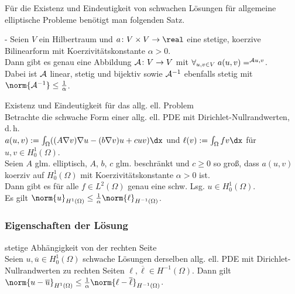 \begin{Bem}
    Für die Existenz und Eindeutigkeit von schwachen Lösungen für allgemeine elliptische Probleme
    benötigt man folgenden Satz.
\end{Bem}

\begin{Satz}{-}
    Seien $V$ ein Hilbertraum und
    $a \colon V \times V \to \real$ eine stetige, koerzive Bilinearform mit
    Koerzivitätskonstante $\alpha > 0$.\\
    Dann gibt es genau eine Abbildung $\mathcal{A}\colon V \to V$ mit
    $\forall_{u, v \in V}\; a(u, v) = \sp{\mathcal{A}u, v}$.\\
    Dabei ist $\mathcal{A}$ linear, stetig und bijektiv sowie $\mathcal{A}^{-1}$ ebenfalls stetig mit
    $\norm{\A^{-1}} \le \frac{1}{\alpha}$.
\end{Satz}

\linie

\begin{Satz}{Existenz und Eindeutigkeit für das allg. ell. Problem}\\
    Betrachte die schwache Form einer allg. ell. PDE mit Dirichlet-Nullrandwerten, d.\,h.\\
    $a(u, v) := \int_\Omega ((A\nabla v) \nabla u - (b \nabla v) u + cuv) \dx$
    und $\ell(v) := \int_\Omega fv \dx$ für $u, v \in H^1_0(\Omega)$.\\
    Seien $A$ glm. elliptisch, $A$, $b$, $c$ glm. beschränkt und
    $c \ge 0$ so groß, dass $a(u, v)$ koerziv auf $H^1_0(\Omega)$ mit Koerzivitätskonstante
    $\alpha > 0$ ist.\\
    Dann gibt es für alle $f \in L^2(\Omega)$ genau eine schw. Lsg. $u \in H^1_0(\Omega)$.\\
    Es gilt $\norm{u}_{H^1(\Omega)} \le \frac{1}{\alpha} \norm{\ell}_{H^{-1}(\Omega)}$.
\end{Satz}

\subsubsection{%
    Eigenschaften der Lösung%
}

\begin{Satz}{stetige Abhängigkeit von der rechten Seite}\\
    Seien $u, \overline{u} \in H^1_0(\Omega)$ schwache Lösungen derselben allg. ell. PDE
    mit Dirichlet-Nullrandwerten zu rechten Seiten $\ell, \overline{\ell} \in H^{-1}(\Omega)$.
    Dann gilt $\norm{u - \overline{u}}_{H^1(\Omega)} \le
    \frac{1}{\alpha} \norm{\ell - \overline{\ell}}_{H^{-1}(\Omega)}$.
\end{Satz}

